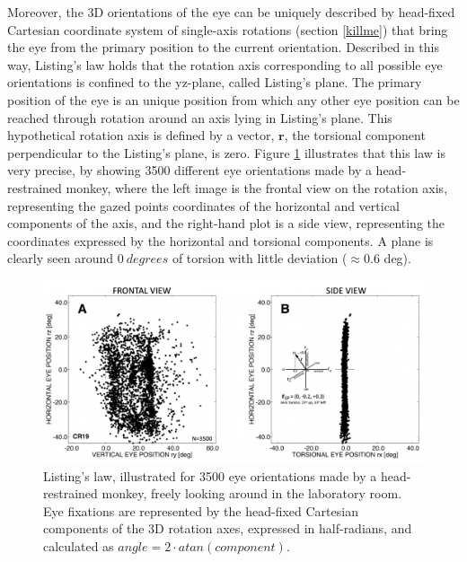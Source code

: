 Moreover, the 3D orientations of the eye can be uniquely described by head-fixed Cartesian coordinate system of single-axis rotations (section \ref{killme}) that bring the eye from the primary position to the current orientation. Described in this way, Listing's law holds that the rotation axis corresponding to all possible eye orientations is confined to the yz-plane, called Listing's plane. The primary position of the eye is an unique position from which any other eye position can be reached through rotation around an axis lying in Listing's plane. This hypothetical rotation axis is defined by a vector, $ \mathbf{r}$, the torsional component perpendicular to the Listing's plane, is zero. 
Figure \ref{sec2:fig:monkey} illustrates that this law is very precise, by showing 3500 different eye orientations made by a head-restrained monkey, where the left image is the frontal view on the rotation axis, representing the gazed points coordinates of the horizontal and vertical components of the axis, and the right-hand plot is a side view, representing the coordinates expressed by the  horizontal and torsional components. A plane is clearly seen around $0 \ degrees$ of torsion with little deviation ($\approx 0.6$ deg).
\begin{figure}[ht]
	\centering
	\includegraphics[width=13cm]{images/ll.png}
	\caption[Listing’s law, illustrated for 3500 eye orientations made by a head-restrained monkey]{Listing’s law, illustrated for 3500 eye orientations made by a head-restrained monkey, freely looking around in the laboratory room. Eye fixations are represented by the head-fixed Cartesian components of the 3D rotation axes, expressed in half-radians, and calculated as $angle = 2 \cdot atan(component)$. \cite{donders}}
	\label{sec2:fig:monkey}
\end{figure}
\cite{donders} 

